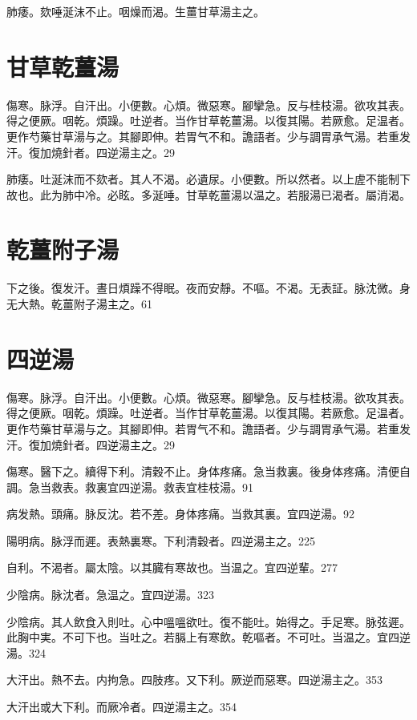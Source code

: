 \documentclass[12pt,twoside,UTF8,b5paper]{ctexbook}
\begin{document}
肺痿。欬唾涎沫不止。咽燥而渴。生薑甘草湯主之。

\section{甘草乾薑湯}

傷寒。脉浮。自汗出。小便數。心煩。微惡寒。腳攣急。反与桂枝湯。欲攻其表。得之便厥。咽乾。煩躁。吐逆者。当作甘草乾薑湯。以復其陽。若厥愈。足温者。更作芍藥甘草湯与之。其腳即伸。若胃气不和。譫語者。少与{調胃}承气湯。若重发汗。復加燒針者。四逆湯主之。29

肺痿。吐涎沫而不欬者。其人不渴。必遺尿。小便數。所以然者。以上虗不能制下故也。此为肺中冷。必眩。多涎唾。甘草乾薑湯以温之。若服湯已渴者。屬消渴。

\section{乾薑附子湯}

下之後。復发汗。晝日煩躁不得眠。夜而安靜。不嘔。不渴。无表証。脉沈微。身无大熱。乾薑附子湯主之。61

\section{四逆湯}

傷寒。脉浮。自汗出。小便數。心煩。微惡寒。腳攣急。反与桂枝湯。欲攻其表。得之便厥。咽乾。煩躁。吐逆者。当作甘草乾薑湯。以復其陽。若厥愈。足温者。更作芍藥甘草湯与之。其腳即伸。若胃气不和。譫語者。少与{調胃}承气湯。若重发汗。復加燒針者。四逆湯主之。29

傷寒。醫下之。續得下利。清穀不止。身体疼痛。急当救裏。後身体疼痛。清便自調。急当救表。救裏宜四逆湯。救表宜桂枝湯。91

病发熱。頭痛。脉反沈。若不差。身体疼痛。当救其裏。宜四逆湯。92

{陽明病。}脉浮而遲。表熱裏寒。下利清穀者。四逆湯主之。225

自利。不渴者。屬太陰。以其臓有寒故也。当温之。宜四逆輩。277

少陰病。脉沈者。急温之。宜四逆湯。323

少陰病。其人飲食入則吐。心中嗢嗢欲吐。復不能吐。始得之。手足寒。脉弦遲。此胸中実。不可下也。当吐之。若膈上有寒飲。乾嘔者。不可吐。当温之。宜四逆湯。324

大汗出。熱不去。内拘急。四肢疼。{又}下利。厥逆而惡寒。四逆湯主之。353

大汗{出}或大下利。而厥冷者。四逆湯主之。354
\end{document}
